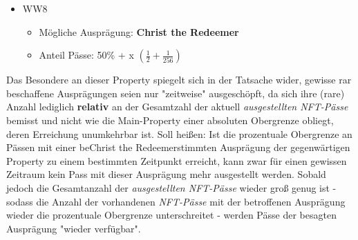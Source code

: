 \begin{NFT-Prop}
\begin{itemize}
\begin{itemize}
    	\item Mögliche Ausprägung: \textbf{Taj Mahal} 
    	\item Anteil Pässe: 25\% $\left( \frac{1}{4} \right)$
    \end{itemize}
    \item WW8
    \begin{itemize}
    	\item Mögliche Ausprägung: \textbf{Christ the Redeemer} 
    	\item Anteil Pässe: 50\% + x $\left( \frac{1}{2} + \frac{1}{256} \right)$
    \end{itemize}
\end{itemize}

\end{NFT-Prop}

\vspace{0.3cm}

Das Besondere an dieser Property spiegelt sich in der Tatsache wider, gewisse rar beschaffene Ausprägungen seien nur "zeitweise" ausgeschöpft, da sich ihre (rare) Anzahl lediglich \textbf{relativ} an der Gesamtzahl der aktuell \textit{ausgestellten NFT-Pässe} bemisst und nicht wie die Main-Property einer absoluten Obergrenze obliegt, deren Erreichung unumkehrbar ist. Soll heißen: Ist die prozentuale Obergrenze an Pässen mit einer beChrist the Redeemerstimmten Ausprägung der gegenwärtigen Property zu einem be\-stimmten Zeitpunkt erreicht, kann zwar für einen gewissen Zeitraum kein Pass mit dieser Ausprägung mehr ausgestellt werden. Sobald jedoch die Gesamtanzahl der \textit{ausgestellten NFT-Pässe} wieder groß genug ist - sodass die Anzahl der vorhandenen \textit{NFT-Pässe} mit der betroffenen Ausprägung wieder die prozentuale Obergrenze unterschreitet - werden Pässe der besagten Ausprägung "wieder verfügbar".

\vspace{0.3cm}

